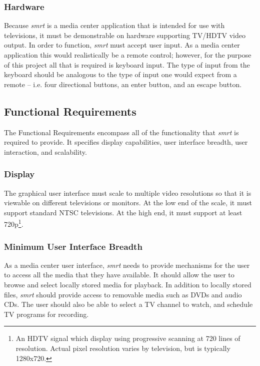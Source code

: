 \documentclass[letterpaper, titlepage, 11pt]{article}
\begin{document}

\subsubsection{Hardware}
Because \textit{smrt} is a media center application that is intended for use
with televisions, it must be demonstrable on hardware supporting TV/HDTV video
output. In order to function, \textit{smrt} must accept user input. As a media
center application this would realistically be a remote control; however, for
the purpose of this project all that is required is keyboard input. The type of
input from the keyboard should be analogous to the type of input one would
expect from a remote -- i.e. four directional buttons, an enter button, and an
escape button.

\subsection{Functional Requirements}
The Functional Requirements encompass all of the functionality that
\textit{smrt} is required to provide. It specifies display capabilities, user
interface breadth, user interaction, and scalability.

\subsubsection{Display}
The graphical user interface must scale to multiple video resolutions so that it is
viewable on different televisions or monitors. At the low end of the scale, it
must support standard NTSC televisions. At the high end, it must support at
least 720p\footnote{An HDTV signal which display using progressive scanning at
720 lines of resolution. Actual pixel resolution varies by television, but is
typically 1280x720.}.

\subsubsection{Minimum User Interface Breadth}
As a media center user interface, \textit{smrt} needs to provide mechanisms for
the user to access all the media that they have available. It should allow
the user to browse and select locally stored media for playback. In addition to
locally stored files, \textit{smrt} should provide access to removable media
such as DVDs and audio CDs. The user should also be able to select a TV channel
to watch, and schedule TV programs for recording.
\end{document}
